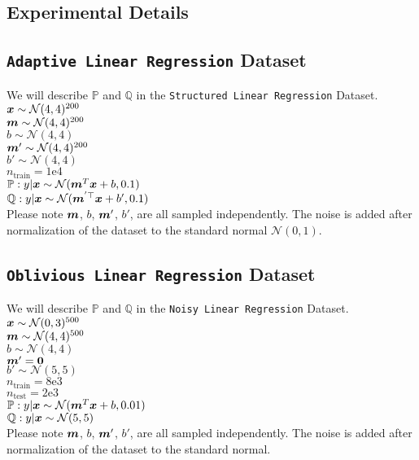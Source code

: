 \documentclass{article} %
\begin{document}
\begin{appendices}
	\newpage
	\section{Experimental Details}\label{app:experimental-details}
	
	\subsection{\texttt{Adaptive Linear Regression} Dataset}
	We will describe $\mathbb{P}$ and $\mathbb{Q}$ in the \texttt{Structured Linear Regression} Dataset.\\
	${\bm{x}} \sim \mathcal{N}(4,4)^{200}$\\
	${\bm{m}} \sim \mathcal{N}(4,4)^{200}$\\
	$b \sim \mathcal{N}(4,4)$\\
	${\bm{m}}' \sim \mathcal{N}(4,4)^{200}$\\
	$b' \sim \mathcal{N}(4,4)$\\
	$n_{\text{train}} = 1\text{e}4$\\
	$\mathbb{P}: y|{\bm{x}} \sim \mathcal{N}({\bm{m}}^T{\bm{x}} + b, 0.1)$\\
	$\mathbb{Q}: y|{\bm{x}} \sim \mathcal{N}({\bm{m}}^{'\top}{\bm{x}} + b', 0.1)$\\
	Please note ${\bm{m}}$, $b$, ${\bm{m}}'$, $b'$, are all sampled independently. The noise is added after normalization of the dataset to the standard normal $\mathcal{N}(0,1)$. 
	
	\subsection{\texttt{Oblivious Linear Regression} Dataset}
	We will describe $\mathbb{P}$ and $\mathbb{Q}$ in the \texttt{Noisy Linear Regression} Dataset.\\
	${\bm{x}} \sim \mathcal{N}(0,3)^{500}$\\
	${\bm{m}} \sim \mathcal{N}(4,4)^{500}$\\
	$b \sim \mathcal{N}(4,4)$\\
	${\bm{m}}' = {\bm{0}}$\\
	$b' \sim \mathcal{N}(5,5)$\\
	$n_{\text{train}} = 8\text{e}3$\\
	$n_{\text{test}} = 2\text{e}3$\\
	$\mathbb{P}: y|{\bm{x}} \sim \mathcal{N}({\bm{m}}^T{\bm{x}} + b, 0.01)$\\
	$\mathbb{Q}: y|{\bm{x}} \sim \mathcal{N}(5,5)$\\
	Please note ${\bm{m}}$, $b$, ${\bm{m}}'$, $b'$, are all sampled independently. The noise is added after normalization of the dataset to the standard normal. 
	

\end{appendices}
\end{document}
